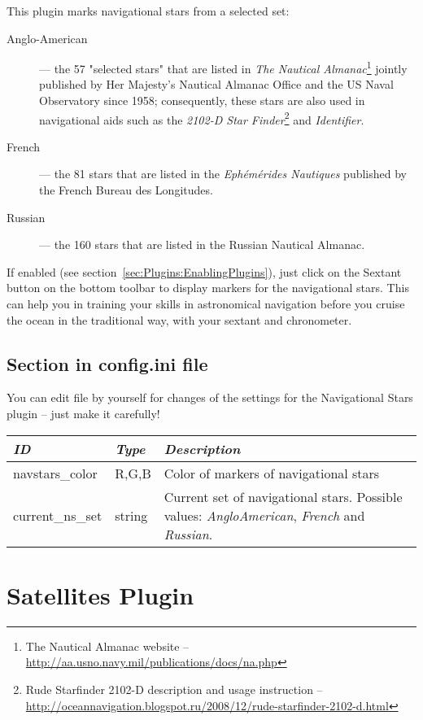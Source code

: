 \noindent This plugin marks navigational stars from a selected set:
\begin{description}
	\item[Anglo-American] --- the 57 "selected stars" that are listed in \emph{The Nautical Almanac}\footnote{The Nautical Almanac
		website -- \url{http://aa.usno.navy.mil/publications/docs/na.php}} jointly published by Her Majesty's Nautical Almanac Office and the US Naval Observatory since 1958; consequently, these stars are also used in navigational aids such as the \emph{2102-D Star Finder}\footnote{Rude Starfinder 2102-D
		description and usage instruction --
		\url{http://oceannavigation.blogspot.ru/2008/12/rude-starfinder-2102-d.html}} and \emph{Identifier}. 
	\item[French] --- the 81 stars that are listed in the \emph{Ephémérides Nautiques} published by the French Bureau des Longitudes.
	\item[Russian] --- the 160 stars that are listed in the Russian Nautical Almanac.
\end{description}
If enabled (see section~\ref{sec:Plugins:EnablingPlugins}), just click
on the Sextant button  on
the bottom toolbar to display markers for the navigational stars. This
can help you in training your skills in astronomical navigation before
you cruise the ocean in the traditional way, with your sextant and
chronometer.


\subsection{Section  in config.ini file}
\label{sec:plugins:NavigationalStars:config}

You can edit  file by yourself for changes of the
settings for the Navigational Stars plugin -- just make it carefully!

\begin{longtabu} to \textwidth {l|l|X}\toprule
\emph{ID}			& \emph{Type} 	& \emph{Description}\\\midrule
navstars\_color 	& R,G,B 		& Color of markers of navigational stars  \\
current\_ns\_set	& string		& Current set of navigational stars. Possible values: \emph{AngloAmerican}, \emph{French} and \emph{Russian}. \\
\bottomrule
\end{longtabu}

\newpage
\section{Satellites Plugin}
\label{sec:plugins:Satellites}

